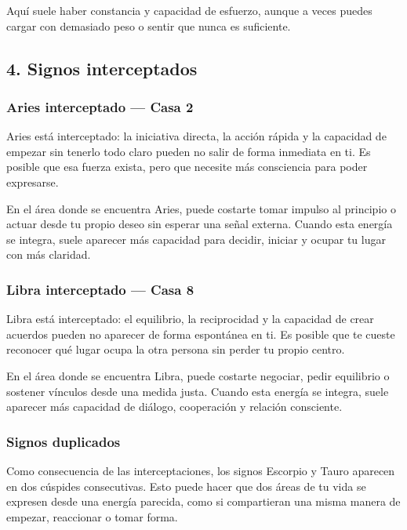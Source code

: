 \documentclass[11pt,a4paper]{article}
\begin{document}
Aquí suele haber constancia y capacidad de esfuerzo, aunque a veces puedes cargar con demasiado peso o sentir que nunca es suficiente.



\vspace{0.5cm}

\subsection{4. Signos interceptados}

\subsubsection*{Aries interceptado — Casa 2}
Aries está interceptado: la iniciativa directa, la acción rápida y la capacidad de empezar sin tenerlo todo claro pueden no salir de forma inmediata en ti. Es posible que esa fuerza exista, pero que necesite más consciencia para poder expresarse.

En el área donde se encuentra Aries, puede costarte tomar impulso al principio o actuar desde tu propio deseo sin esperar una señal externa. Cuando esta energía se integra, suele aparecer más capacidad para decidir, iniciar y ocupar tu lugar con más claridad.

\subsubsection*{Libra interceptado — Casa 8}
Libra está interceptado: el equilibrio, la reciprocidad y la capacidad de crear acuerdos pueden no aparecer de forma espontánea en ti. Es posible que te cueste reconocer qué lugar ocupa la otra persona sin perder tu propio centro.

En el área donde se encuentra Libra, puede costarte negociar, pedir equilibrio o sostener vínculos desde una medida justa. Cuando esta energía se integra, suele aparecer más capacidad de diálogo, cooperación y relación consciente.

\subsubsection*{Signos duplicados}
Como consecuencia de las interceptaciones, los signos Escorpio y Tauro aparecen en dos cúspides consecutivas. Esto puede hacer que dos áreas de tu vida se expresen desde una energía parecida, como si compartieran una misma manera de empezar, reaccionar o tomar forma.
\end{document}
